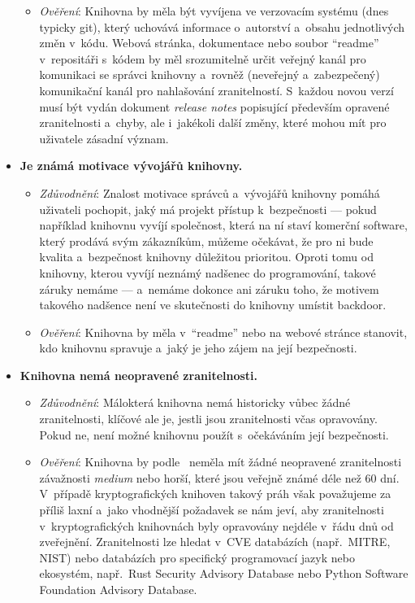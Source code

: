 \begin{itemize}
\begin{itemize}[beginpenalty=10000]
        \item \textit{Ověření}: Knihovna by měla být vyvíjena ve verzovacím systému (dnes typicky git), který uchovává informace o~autorství a~obsahu jednotlivých změn v~kódu. Webová stránka, dokumentace nebo soubor ``readme'' v~repositáři s~kódem by měl srozumitelně určit veřejný kanál pro komunikaci se správci knihovny a~rovněž (neveřejný a~zabezpečený) komunikační kanál pro nahlašování zranitelností. S~každou novou verzí musí být vydán dokument \textit{release notes} popisující především opravené zranitelnosti a~chyby, ale i~jakékoli další změny, které mohou mít pro uživatele zásadní význam.
    \end{itemize}

    \item \textbf{Je známá motivace vývojářů knihovny.} 
    \begin{itemize}[beginpenalty=10000]
        \item \textit{Zdůvodnění}: Znalost motivace správců a~vývojářů knihovny pomáhá uživateli pochopit, jaký má projekt přístup k~bezpečnosti --- pokud například knihovnu vyvíjí společnost, která na ní staví komerční software, který prodává svým zákazníkům, můžeme očekávat, že pro ni bude kvalita a~bezpečnost knihovny důležitou prioritou. Oproti tomu od knihovny, kterou vyvíjí neznámý nadšenec do programování, takové záruky nemáme --- a~nemáme dokonce ani záruku toho, že motivem takového nadšence není ve skutečnosti do knihovny umístit backdoor.

        \item \textit{Ověření}: Knihovna by měla v~``readme'' nebo na webové stránce stanovit, kdo knihovnu spravuje a~jaký je jeho zájem na její bezpečnosti.
    \end{itemize}

    \item \textbf{Knihovna nemá neopravené zranitelnosti.} 
    \begin{itemize}[beginpenalty=10000]
        \item \textit{Zdůvodnění}: Málokterá knihovna nemá historicky vůbec žádné zranitelnosti, klíčové ale je, jestli jsou zranitelnosti včas opravovány. Pokud ne, není možné knihovnu použít s~o\-če\-ká\-vá\-ním její bezpečnosti.

        \item \textit{Ověření}: Knihovna by podle~\cite{concise-guide-eval} neměla mít žádné neopravené zranitelnosti závažnosti \textit{medium} nebo horší, které jsou veřejně známé déle než 60 dní. V~případě kryptografických knihoven takový práh však považujeme za příliš laxní a~jako vhodnější požadavek se nám jeví, aby zranitelnosti v~kryptografických knihovnách byly opravovány nejdéle v~řádu dnů od zveřejnění. Zranitelnosti lze hledat v~CVE databázích (např.\ MITRE, NIST) nebo databázích pro specifický programovací jazyk nebo ekosystém, např.\ Rust Security Advisory Database nebo Python Software Foundation Advisory Database.
    \end{itemize}


\end{itemize}
